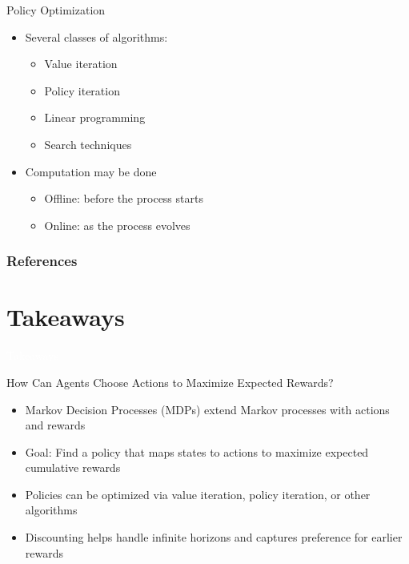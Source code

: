 \documentclass[11pt,table]{beamer}
\begin{document}
\begin{frame}{Policy Optimization}

\begin{itemize}
    \item Several classes of algorithms:
\begin{itemize}
    \item \textcolor{red1}{Value iteration}
\item \textcolor{red1}{Policy iteration}
\item \textcolor{red1}{Linear programming}
\item \textcolor{red1}{Search techniques}
 
\end{itemize}

 \item Computation may be done


\begin{itemize}
    \item \textcolor{red1}{Offline}: before the process starts
\item \textcolor{red1}{Online}: as the process evolves
 
\end{itemize}
\end{itemize}
    
\end{frame}


\begin{frame}[t,allowframebreaks
]%
\frametitle{References}
\small

\end{frame}
\section{Takeaways}
{
\begin{frame}
\centering
\Huge
\textcolor{white}{Takeaways}
\thispagestyle{empty}
\end{frame}
}

\begin{frame}{How Can Agents Choose Actions to Maximize Expected Rewards?}

\begin{itemize}
    \item Markov Decision Processes (MDPs) extend Markov processes with actions and rewards
    \item Goal: Find a policy that maps states to actions to maximize expected cumulative rewards		
    \item Policies can be optimized via value iteration, policy iteration, or other algorithms
    \item Discounting helps handle infinite horizons and captures preference for earlier rewards
\end{itemize}
\end{frame}
\end{document}
